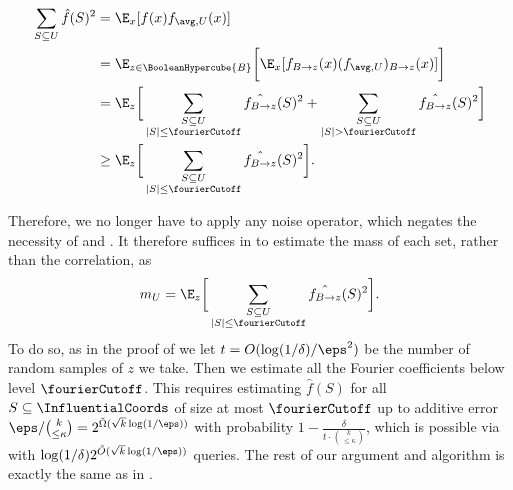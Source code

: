 \begin{align*}
    \sum_{S \subseteq U}\hat{f}(S)^2 &= \E_x[f(x)f_{\avg, U}(x)] \\
    &= \E_{z\in \BooleanHypercube{B}} \bigg [ \E_x[f_{B\to z}(x)(f_{\avg, U})_{B \to z}(x)]\bigg]\\
    &= \E_z \bigg [  \sum_{\substack{S \subseteq U \\ |S| \leq \fourierCutoff}}\hat{f_{B\to z}}(S)^2 + \sum_{\substack{S \subseteq U \\ |S| > \fourierCutoff}}\hat{f_{B\to z}}(S)^2\bigg ]\\
    &\geq \E_z \bigg [  \sum_{\substack{S \subseteq U \\ |S| \leq \fourierCutoff}}\hat{f_{B\to z}}(S)^2 \bigg ]. 
\end{align*}

Therefore, we no longer have to apply any noise operator, which negates the necessity of  and . It therefore suffices in  to estimate the mass of each set, rather than the correlation, as 
$$m_U =\E_z \bigg [  \sum_{\substack{S \subseteq U \\ |S| \leq \fourierCutoff}}\hat{f_{B\to z}}(S)^2 \bigg ].$$
To do so, as in the proof of  we let $t = O(\log(1/\delta)/\eps^2)$ be the number of random samples of $z$ we take. Then we estimate all the Fourier coefficients below level $\fourierCutoff$. This requires estimating $\hat{f}(S)$ for all $S \subseteq\InfluentialCoords$ of size at most $\fourierCutoff$ up to additive error $\eps/\binom{k}{\leq \kappa} = 2^{\tilde{\Omega}(\sqrt{k}\log(1/\eps))}$ with probability $1-\frac{\delta}{t\cdot \binom{k}{\leq \kappa}}$, which is possible via  with $\log(1/\delta)2^{\Tilde{O}(\sqrt{k}\log(1/\eps))}$ queries. The rest of our argument and algorithm is exactly the same as in .





